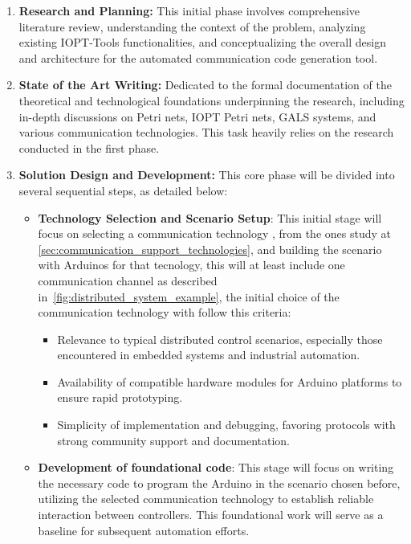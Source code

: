 \begin{enumerate}
    \item \textbf{Research and Planning:} This initial phase involves comprehensive literature review, understanding the context of the problem, analyzing existing IOPT-Tools functionalities, and conceptualizing the overall design and architecture for the automated communication code generation tool.



    \item \textbf{State of the Art Writing:} Dedicated to the formal documentation of the theoretical and technological foundations underpinning the research, including in-depth discussions on Petri nets, IOPT Petri nets, GALS systems, and various communication technologies. This task heavily relies on the research conducted in the first phase.





    \item \textbf{Solution Design and Development:} 
	This core phase will be divided into several sequential steps, as detailed below:   
    
    \begin{itemize}
    \item \textbf{Technology Selection and Scenario Setup}:
	This initial stage will focus on selecting a communication technology , from the ones study at \ref{sec:communication_support_technologies}, and building the scenario with Arduinos for that tecnology, this will at least include one communication channel as described in~\ref{fig:distributed_system_example}, the initial choice of the communication technology with follow this criteria:
    \begin{itemize}
    \item Relevance to typical distributed control scenarios, especially those encountered in embedded systems and industrial automation.
    \item Availability of compatible hardware modules for Arduino platforms to ensure rapid prototyping.
    \item Simplicity of implementation and debugging, favoring protocols with strong community support and documentation.
    \end{itemize}
    \item \textbf{Development of foundational code}:  
This stage will focus on writing the necessary code to program the Arduino in the scenario chosen before, utilizing the selected communication technology to establish reliable interaction between controllers. This foundational work will serve as a baseline for subsequent automation efforts. 



\end{itemize}
\end{enumerate}
